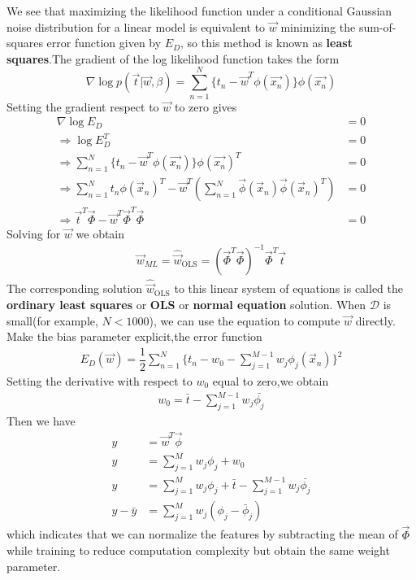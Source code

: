 We see that maximizing the likelihood function under a conditional Gaussian noise distribution for a linear model is equivalent to $\vec{w}$ minimizing the sum-of-squares error function given by $E_D$, so this method is known as \textbf{least squares}.The gradient of the log likelihood function takes the form
\begin{equation}
\nabla\log p(\vec{t}|\vec{w},\beta)
=\sum_{n=1}^{N}\{t_n-\vec{w}^T\phi(\vec{x_n}) \}\phi(\vec{x_n})
\end{equation}
Setting the gradient respect to $\vec{w}$ to zero gives
\begin{align}
\nabla\log E_D &= 0 \\
\Rightarrow\log E_D^T &= 0 \\
\Rightarrow \sum_{n=1}^{N}\{t_n-\vec{w}^T\phi(\vec{x_n}) \}\phi(\vec{x_n})^T &= 0 \\
\Rightarrow \sum_{n=1}^{N}t_n\phi(\vec{x}_n)^T-\vec{w}^T(\sum_{n=1}^{N}\vec{\phi}(\vec{x}_n)\vec{\phi}(\vec{x}_n)^T) &= 0 \\
\Rightarrow \vec{t}^T \vec{\Phi} - \vec{w}^T\vec{\Phi}^T \vec{\Phi} &= 0
\end{align}
Solving for $\vec{w}$ we obtain
\begin{align}
\vec{w}_{ML}=\hat{\vec{w}}_{\mathrm{OLS}}=(\vec{\Phi}^T\vec{\Phi})^{-1}\vec{\Phi}^T\vec{t}
\end{align} 
The corresponding solution $\hat{\vec{w}}_{\mathrm{OLS}}$ to this linear system of equations is called the \textbf{ordinary least squares} or \textbf{OLS} or \textbf{normal equation} solution. When $\mathcal{D}$ is small(for example, $N < 1000$), we can use the equation to compute $\vec{w}$ directly.
Make the bias parameter explicit,the error function
\begin{align}
E_D(\vec{w})=\dfrac{1}{2}\sum_{n=1}^{N}\{t_n-w_0-\sum_{j=1}^{M-1}w_j\phi_j(\vec{x}_n)\}^2
\end{align}
Setting the derivative with respect to $w_0$ equal to zero,we obtain
\begin{align}
w_0 = \bar{t}-\sum_{j=1}^{M-1}w_j\bar{\phi_j}
\end{align}
Then we have
\begin{align}
y&=\vec{w}^T\vec{\phi} \\
y&=\sum_{j=1}^{M}w_j \phi_j+w_0 \\
y&=\sum_{j=1}^{M}w_j \phi_j+\bar{t}-\sum_{j=1}^{M-1}w_j\bar{\phi_j} \\
y-\bar{y}&=\sum_{j=1}^{M}w_j(\phi_j-\bar{\phi}_j)
\end{align}
which indicates that we can normalize the features by subtracting the mean of $\vec{\Phi}$ while training to reduce computation complexity but obtain the same weight parameter.


